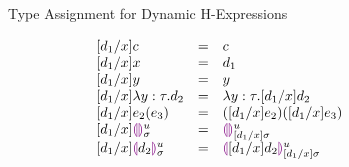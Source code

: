 \begin{figure}[!ht]
\begin{mathpar}






\end{mathpar}
\caption{Type Assignment for Dynamic H-Expressions}
\label{fig:hasType}
\end{figure}

\begin{figure}[!ht]
\[
\begin{array}{lcl}
[\dexp_1 / x] c
&=&
c\\
{[\dexp_1 / x] x}
&=&
\dexp_1\\
{[\dexp_1 / x] y}
&=&
y\\
{[\dexp_1 / x] \dlam{y}{\htau}{\dexp_2}}
&=&
{\dlam{y}{\htau}{[\dexp_1 / x] \dexp_2}}
\\
{[\dexp_1 / x] \dap{e_2}{e_3}}
&=&
{\dapP{[\dexp_1 / x] e_2}{[\dexp_1 / x] e_3}}
\\
{[\dexp_1 / x]} \dehole{\mvar}{\subst}
&=&
\dehole{\mvar}{[\dexp_1 / x] \subst}
\\
{[\dexp_1 / x] \dhole{\dexp_2}{\mvar}{\subst}}
&=&
\dhole{ [ \dexp_1 / x ] \dexp_2 }{\mvar}{[\dexp_1 / x] \subst}
\end{array}
\]
\end{figure}

